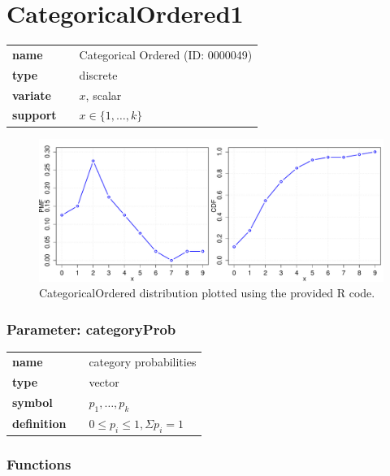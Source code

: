 \section*{CategoricalOrdered1} 

  \bigskip 

\begin{tabular}{p{2cm}cl}
\textbf{name} & & Categorical Ordered (ID: 0000049)\\ 
 
\textbf{type} & & discrete \\ 

\textbf{variate} & & $x$, scalar \\ 

\textbf{support} & & $x \in \{1,\dots,k\}$
\end{tabular}

\begin{figure}[ht!]
\centering
  \includegraphics[width=140mm]{pics/CategoricalOrdered.pdf}
 \caption{CategoricalOrdered distribution plotted using the provided R code.}
 \label{fig:CategoricalOrdered}
\end{figure}

\subsubsection*{Parameter: categoryProb}

\noindent\begin{tabular}{p{2cm}cl}
\textbf{name} & & category probabilities \\
\textbf{type} & & vector \\
\textbf{symbol} & & $p_1, \ldots, p_k$  \\
\textbf{definition} & & $0 \leq p_i \leq 1, \Sigma p_i = 1$
\end{tabular}
\subsubsection*{Functions}

